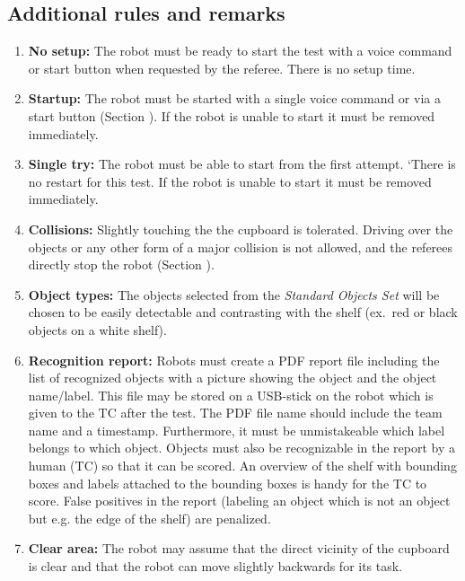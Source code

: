 \subsection{Additional rules and remarks}
\begin{enumerate}
\item \textbf{No setup:} The robot must be ready to start the test with a voice command or start button when requested by the referee. There is no setup time.
\item \textbf{Startup:} The robot must be started with a single voice command or via a start button (Section ). If the robot is unable to start it must be removed immediately.
\item \textbf{Single try:} The robot must be able to start from the first attempt. 
`There is no restart for this test. If the robot is unable to start it must be removed immediately.
\item \textbf{Collisions:} Slightly touching the the cupboard is tolerated.
  Driving over the objects or any other form of a major collision is not allowed, and the referees directly stop the robot (Section ).
\item \textbf{Object types:} The objects selected from the \textit{Standard Objects Set} will be chosen to be easily detectable and contrasting with the shelf (ex.~red or black objects on a white shelf).
\item \textbf{Recognition report:} Robots must create a PDF report file including the list of recognized objects with a picture showing the object and the object name/label.
  This file may be stored on a USB-stick on the robot which is given to the TC after the test. The PDF file name should include the team name and a timestamp. 
  Furthermore, it must be unmistakeable which label belongs to which object. Objects must also be recognizable in the report by a human (TC) so that it can be scored. 
  An overview of the shelf with bounding boxes and labels attached to the bounding boxes is handy for the TC to score.
  False positives in the report (labeling an object which is not an object but e.g. the edge of the shelf) are penalized.
  \item \textbf{Clear area: } The robot may assume that the direct vicinity of the cupboard is clear and that the robot can move slightly backwards for its task. 
\end{enumerate}

